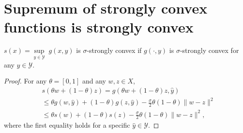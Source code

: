 \documentclass[final,12pt]{colt2018} %
\def\reals{\mathbb{R}}
\def\reals{\mathbb{R}}
\def\K{\mathcal{K}}
\def\argmax{\mathop{\arg\max}}
\newcommand{\norm}[1]{\left\lVert#1\right\rVert}
\newcommand{\YY}{\mathcal{Y}}
\begin{document}
\section{Supremum of strongly convex functions is strongly convex}

\begin{lemma} \label{mysc}
$s(x) = \underset{y \in \YY}{\sup}\; g(x,y)$ is $\sigma$-strongly convex if $g(\cdot,y)$ is $\sigma$-strongly convex for any $y \in \YY$.
\end{lemma}

\begin{proof}
For any $\theta=[0,1]$ and any $w,z \in X$,
\begin{equation}
\begin{aligned}
& s(\theta w + (1-\theta) z ) = g( \theta w + (1-\theta) z , \hat{y} )
\\ &\leq \theta g(w, \hat{y}) +  (1-\theta) g(z, \hat{y}) - \frac{\sigma}{2} \theta (1 -\theta) \| w -z \|^2
\\ &\leq \theta s(w) + (1-\theta) s(z) - \frac{\sigma}{2} \theta (1 -\theta) \| w -z \|^2,
\end{aligned}
\end{equation}
where the first equality holds for a specific $\hat{y} \in \YY$.

\end{proof}


\begin{comment}

\section{Another definition of strongly convex sets} \label{app:scset}

    It is shown in Proposition A.1 of~(\cite{HLGS16}) that an $\lambda$-strongly convex set
    can be expressed as the intersection of infinitely many Euclidean balls.  Denote that
    the $d$ dimensional unit sphere
    ${\mathcal{S} = \left\{ u \in \reals^d : \norm{u}^2 = 1 \right\}}$
    and write $x_u = \underset{x \in \K}{\argmax} \left\langle x, u \right\rangle$
    for some $u \in \mathcal{S}$. A $\lambda$-strongly convex set $\K$ can be written as
    \[ \K = \underset{u \in \mathcal{S}}{\cap} B_{\frac{1}{\lambda}} \left( x_u - \frac{u}{\lambda} \right) ,\]
    where $B_{\frac{1}{\lambda}} \left( x_u - \frac{u}{\lambda} \right)$ represents
    a ball centered at $x_u - \frac{u}{\lambda}$ with radius of $\frac{1}{\lambda}$ in L2 norm.
\end{comment}
\end{document}
